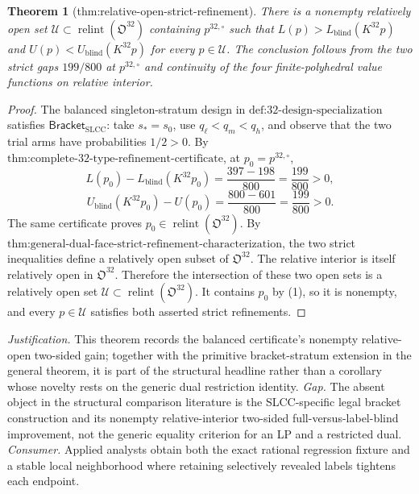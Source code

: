 \documentclass{article}
\newtheorem{theorem}{Theorem}
\begin{document}
\begin{theorem}[thm:relative-open-strict-refinement]\label{thm:relative-open-strict-refinement}
There is a nonempty relatively open set \(\mathcal U\subset\operatorname{relint}(\mathfrak O^{32})\) containing \(p^{32,\circ}\) such that \(L(p)>L_{\mathrm{blind}}(K^{32}p)\) and \(U(p)<U_{\mathrm{blind}}(K^{32}p)\) for every \(p\in\mathcal U\). The conclusion follows from the two strict gaps \(199/800\) at \(p^{32,\circ}\) and continuity of the four finite-polyhedral value functions on relative interior.
\end{theorem}
\begin{proof}
The balanced singleton-stratum design in \(\text{def:32-design-specialization}\) satisfies \(\mathsf{Bracket}_{\mathrm{SLCC}}\): take \(s_*=s_0\), use \(q_\ell<q_m<q_h\), and observe that the two trial arms have probabilities \(1/2>0\).  By \(\text{thm:complete-32-type-refinement-certificate}\), at \(p_0=p^{32,\circ}\),
\[
L(p_0)-L_{\mathrm{blind}}(K^{32}p_0)
=\frac{397-198}{800}=\frac{199}{800}>0,
\]
\[
U_{\mathrm{blind}}(K^{32}p_0)-U(p_0)
=\frac{800-601}{800}=\frac{199}{800}>0.
\tag{1}
\]
The same certificate proves \(p_0\in\operatorname{relint}(\mathfrak O^{32})\).  By \(\text{thm:general-dual-face-strict-refinement-characterization}\), the two strict inequalities define a relatively open subset of \(\mathfrak O^{32}\).  The relative interior is itself relatively open in \(\mathfrak O^{32}\).  Therefore the intersection of these two open sets is a relatively open set \(\mathcal U\subset\operatorname{relint}(\mathfrak O^{32})\).  It contains \(p_0\) by (1), so it is nonempty, and every \(p\in\mathcal U\) satisfies both asserted strict refinements.
\end{proof}
\par\smallskip\noindent \textit{Justification.} This theorem records the balanced certificate's nonempty relative-open two-sided gain; together with the primitive bracket-stratum extension in the general theorem, it is part of the structural headline rather than a corollary whose novelty rests on the generic dual restriction identity. \textit{Gap.} The absent object in the structural comparison literature is the SLCC-specific legal bracket construction and its nonempty relative-interior two-sided full-versus-label-blind improvement, not the generic equality criterion for an LP and a restricted dual. \textit{Consumer.} Applied analysts obtain both the exact rational regression fixture and a stable local neighborhood where retaining selectively revealed labels tightens each endpoint.
\end{document}
